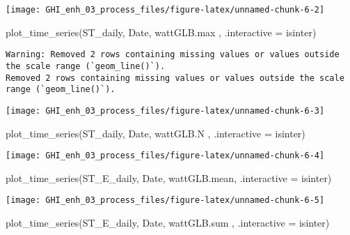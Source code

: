 \documentclass[
  10pt,
  a4paper,oneside]{article}
\newenvironment{Shaded}{\begin{snugshade}}{\end{snugshade}}
\newcommand{\AttributeTok}[1]{\textcolor[rgb]{0.77,0.63,0.00}{#1}}
\newcommand{\FunctionTok}[1]{\textcolor[rgb]{0.00,0.00,0.00}{#1}}
\newcommand{\NormalTok}[1]{#1}
\begin{document}
\begin{center}\texttt{[image: GHI\_enh\_03\_process\_files/figure-latex/unnamed-chunk-6-2]} \end{center}

\begin{Shaded}
\begin{Highlighting}[]
\FunctionTok{plot\_time\_series}\NormalTok{(ST\_daily, Date, wattGLB.max , }\AttributeTok{.interactive =}\NormalTok{ isinter)}
\end{Highlighting}
\end{Shaded}

\begin{verbatim}
Warning: Removed 2 rows containing missing values or values outside the scale range (`geom_line()`).
Removed 2 rows containing missing values or values outside the scale range (`geom_line()`).
\end{verbatim}

\begin{center}\texttt{[image: GHI\_enh\_03\_process\_files/figure-latex/unnamed-chunk-6-3]} \end{center}

\begin{Shaded}
\begin{Highlighting}[]
\FunctionTok{plot\_time\_series}\NormalTok{(ST\_daily, Date, wattGLB.N   , }\AttributeTok{.interactive =}\NormalTok{ isinter)}
\end{Highlighting}
\end{Shaded}

\begin{center}\texttt{[image: GHI\_enh\_03\_process\_files/figure-latex/unnamed-chunk-6-4]} \end{center}

\begin{Shaded}
\begin{Highlighting}[]
\FunctionTok{plot\_time\_series}\NormalTok{(ST\_E\_daily, Date, wattGLB.mean, }\AttributeTok{.interactive =}\NormalTok{ isinter)}
\end{Highlighting}
\end{Shaded}

\begin{center}\texttt{[image: GHI\_enh\_03\_process\_files/figure-latex/unnamed-chunk-6-5]} \end{center}

\begin{Shaded}
\begin{Highlighting}[]
\FunctionTok{plot\_time\_series}\NormalTok{(ST\_E\_daily, Date, wattGLB.sum , }\AttributeTok{.interactive =}\NormalTok{ isinter)}
\end{Highlighting}
\end{Shaded}
\end{document}
